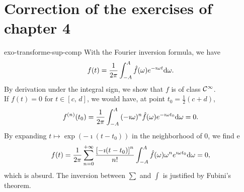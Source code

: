 \section{Correction of the exercises of chapter 4}
 
 
\begin{correction}{exo-transforme-sup-comp}
 With the Fourier inversion formula, we have
\begin{equation*}
f(t) = \frac{1}{2 \pi} \int_{- A}^A{\hat{f} (\omega) e^{- \imath \omega t} \mathrm{d} \omega}.
\end{equation*}
By derivation under the integral sign, we show that $ f $ is of class $ \mathcal{C}^\infty $. \\If $ f(t) = 0 $ for $ t \in [c, \, d] $, we would have, at point $ t_0 = \frac{1}{2} (c + d) $,
\begin{equation*}
f^{(n)} (t_0) = \frac{1}{2 \pi} \int_{- A}^A{(- \imath \omega)^n \hat{f} (\omega) e^{- \imath \omega t_0} \mathrm{d} \omega} = 0.
\end{equation*}
By expanding $ t \mapsto \exp(- \imath (t-t_0)) $ in the neighborhood of 0, we find e
\begin{equation*}
f(t) = \frac{1}{2 \pi} \sum_{n = 0}^{+ \infty}{\frac{\left[- \imath (t-t_0) \right]^n}{n!} \int_{- A}^A{\hat{f} (\omega) \omega^ne^{\imath \omega t_0} \mathrm{d} \omega}} = 0,
\end{equation*}
which is absurd. The inversion between $ \sum $ and $ \int $ is justified by Fubini's theorem.
\end{correction}
 
